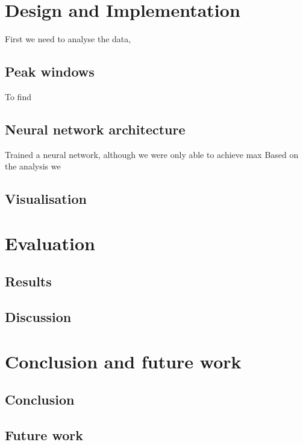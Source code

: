 \chapter{Design and Implementation}

First we need to analyse the data,


\section{Peak windows}
To find

\section{Neural network architecture}

Trained a neural network, although we were only able to achieve max
Based on the analysis we

\section{Visualisation}


\chapter{Evaluation}
\section{Results}
\section{Discussion}

\chapter{Conclusion and future work}
\section{Conclusion}
\section{Future work}


